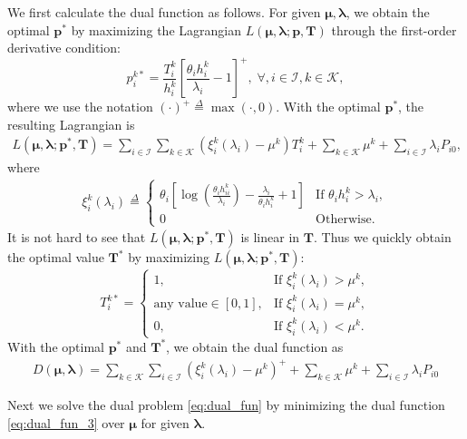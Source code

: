 \documentclass[conference]{IEEEtran}
\newcommand{\mdef}{\overset{\Delta}{=}}
\newcommand{\mi}{\mathcal{I}}
\newcommand{\mk}{\mathcal{K}}
\newcommand{\bb}{\boldsymbol}
\begin{document}
We first calculate the dual function as follows. For given $\bb{\mu},\bb{\lambda}$, we obtain the optimal $\bb{p}^*$ by maximizing the Lagrangian $L(\bb{\mu},\bb{\lambda};\bb{p},\bb{T})$ through the first-order derivative condition:
\begin{equation}
\label{eq:opt_p}    p^{k*}_i=\frac{T_i^k}{h_{i}^k}\left[\frac{\theta_ih_{i}^k}{\lambda_i}-1\right]^+, \;\forall,i\in\mi,k\in\mk,
\end{equation}
where we use the notation $(\cdot)^+\mdef \max(\cdot,0)$. With the optimal $\bb{p}^*$, the resulting Lagrangian is
\begin{align*}
L(\bb{\mu},\bb{\lambda};\bb{p}^*,\bb{T})\!=\!\!\!\sum_{i\in \mi}\!\sum_{k\in\mk}\!\! \left(\xi_i^k({\lambda_i})\!-\!\mu^k\right)\!T_i^k
\!+\!\!\!\sum_{k\in\mk}\mu^k\!\!+\!\!\!\sum_{i\in\mi}\!\lambda_iP_{i0},
\end{align*}
where
\begin{align}
\xi_i^k({\lambda_i})\!\mdef\!
\begin{cases}
\theta_i\left[\log\left(\frac{\theta_ih_{ii}^k}{\lambda_i}\right)-\frac{\lambda_i}{\theta_ih_{i}^k}+1\right]& \text{If } \theta_ih_{i}^k>\lambda_i,\\
0 &\text{Otherwise. }
\end{cases}
\end{align}
It is not hard to see that $L(\bb{\mu},\bb{\lambda};\bb{p}^*,\bb{T})$ is linear in $\bb{T}$. Thus we quickly obtain the optimal value $\bb{T}^*$ by maximizing $L(\bb{\mu},\bb{\lambda};\bb{p}^*,\bb{T})$:
\begin{equation}
\label{eq:opt_T}
    T_i^{k*}=
	 \begin{cases}
		1, & \text{If } \xi_i^k(\lambda_i)>\mu^k,\\
     \text{any value}\in[0,1], & \text{If } \xi_i^k(\lambda_i)=\mu^k,\\
	   0, & \text{If } \xi_i^k(\lambda_i)<\mu^k.
	 \end{cases}
\end{equation}
With the optimal $\bb{p}^*$ and $\bb{T}^*$, we obtain the dual function as
\begin{align}
\label{eq:dual_fun_3}
    D(\bb{\mu},\bb{\lambda})\!=\!\!\sum_{k\in\mk}\sum_{i\in \mi} \left(\xi_i^k({\lambda_i})-\mu^k\right)^+\!\!
+\!\!\sum_{k\in\mk}\mu^k\!\!+\!\!\sum_{i\in\mi}\lambda_iP_{i0}
\end{align}



Next we solve the dual problem \eqref{eq:dual_fun} by minimizing the dual function \eqref{eq:dual_fun_3} over $\bb{\mu}$ for given $\bb{\lambda}$.
\end{document}
